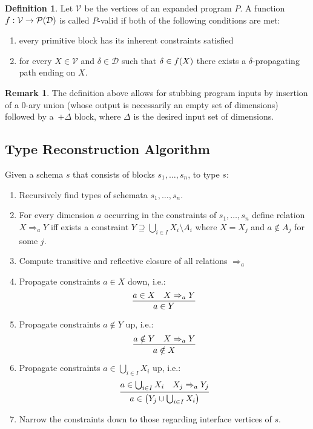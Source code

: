 \documentclass{article}
\theoremstyle{definition}
\newtheorem{definition}{Definition}[section]
\theoremstyle{definition}
\theoremstyle{definition}
\theoremstyle{definition}
\newtheorem{remark}{Remark}[section]
\theoremstyle{definition}
\begin{document}
\begin{definition}
    Let \(\mathcal{V}\) be the vertices of an expanded program \(P\). A function \(f : \mathcal{V} \function \powerset\pars{\mathcal{D}}\) is called \(P\)-valid if both of the following conditions are met:
    \begin{enumerate}
        \item every primitive block has its inherent constraints satisfied
        \item for every \(X \in \mathcal{V}\) and \(\delta \in \mathcal{D}\) such that \(\delta \in f\pars{X}\) there exists a \(\delta\)-propagating path ending on \( X \).
    \end{enumerate}
\end{definition}

\begin{remark}
    The definition above allows for stubbing program inputs by insertion of a \(0\)-ary union (whose output is necessarily an empty set of dimensions) followed by a~\(+\Delta\) block, where \(\Delta\) is the desired input set of dimensions.
\end{remark}\subsection{Type Reconstruction Algorithm}

Given a schema \( s \) that consists of blocks \( s_1, \dots, s_n \), to type \( s \):
\begin{enumerate}
    \item Recursively find types of schemata \( s_1, \dots, s_n \).
    \item For every dimension \( a \) occurring in the constraints of \( s_1, \dots, s_n \) define relation \( X \Rightarrow_a Y \) iff exists a constraint \( Y \supseteq \bigcup_{i \in I} X_i \setminus A_i \) where \( X = X_j \) and \( a \notin A_j \) for some \( j \).
    \item Compute transitive and reflective closure of all relations \( \Rightarrow_a \)
    \item Propagate constraints \( a \in X \) down, i.e.:
    \[
        \infer{a \in Y}{a \in X & X \Rightarrow_a Y}
    \]
    
    \item Propagate constraints \( a \notin Y \) up, i.e.:
    \[
        \infer{a \notin X}{a \notin Y & X \Rightarrow_a Y}
    \]
    
    \item Propagate constraints \( a \in \bigcup_{i \in I} X_i \) up, i.e.:
    \[
        \infer{a \in \pars{Y_j \cup \bigcup_{i \in I} X_i}}{a \in \bigcup_{i \in I} X_i & X_j \Rightarrow_a Y_j}    
    \]
    
    \item Narrow the constraints down to those regarding interface vertices of \( s \).
\end{enumerate}
\end{document}
